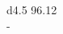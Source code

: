 \documentclass[border = 1mm]{standalone}
\begin{document}
    
\begin{tabular}{d{4.5}}
    96.12 \\
    - \\
    \hline
     \\
    \hline\\
\end{tabular}
\end{document}
